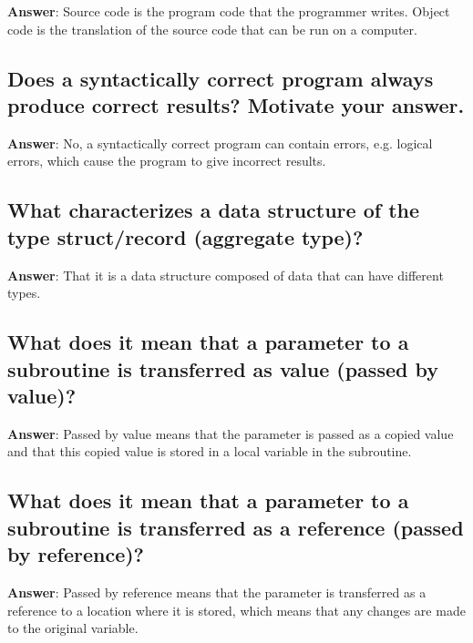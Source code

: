 \documentclass[a4paper,11pt,oneside]{article}
\begin{document}
\begin{sloppypar}
\textbf{Answer}: Source code is the program code that the programmer writes. Object code is the translation of the source code that can be run on a computer.



\subsection{Does a syntactically correct program always produce correct results? Motivate your answer.}

\label{q:193:sa:en:True}

\textbf{Answer}: No, a syntactically correct program can contain errors, e.g. logical errors, which cause the program to give incorrect results.



\subsection{What characterizes a data structure of the type struct/record (aggregate type)?}

\label{q:194:sa:en:True}

\textbf{Answer}: That it is a data structure composed of data that can have different types.



\subsection{What does it mean that a parameter to a subroutine is transferred as value (passed by value)?}

\label{q:195:sa:en:True}

\textbf{Answer}: Passed by value means that the parameter is passed as a copied value and that this copied value is stored in a local variable in the subroutine.



\subsection{What does it mean that a parameter to a subroutine is transferred as a reference (passed by reference)?}

\label{q:196:sa:en:True}

\textbf{Answer}: Passed by reference means that the parameter is transferred as a reference to a location where it is stored, which means that any changes are made to the original variable.




\end{sloppypar}
\end{document}
